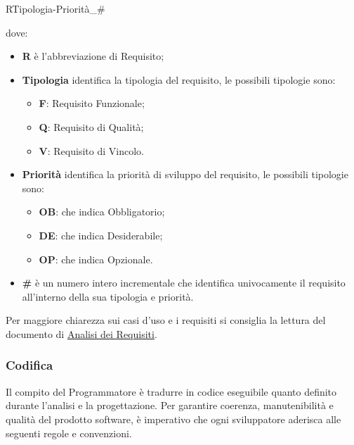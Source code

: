 		\begin{center} RTipologia-Priorità\_\# \end{center}
		dove:
		\begin{itemize}
			\item \textbf{R} è l'abbreviazione di Requisito;
			\item \textbf{Tipologia} identifica la tipologia del requisito, le possibili tipologie sono:
				\begin{itemize}[itemsep=3pt, parsep=1pt, label=$\scriptstyle\bullet$]
					\item \textbf{F}: Requisito Funzionale;
					\item \textbf{Q}: Requisito di Qualità;
					\item \textbf{V}: Requisito di Vincolo.
				\end{itemize}
			\item \textbf{Priorità} identifica la priorità di sviluppo del requisito, le possibili tipologie sono:
				\begin{itemize}[itemsep=3pt, parsep=1pt, label=$\scriptstyle\bullet$]
					\item \textbf{OB}: che indica Obbligatorio;
					\item \textbf{DE}: che indica Desiderabile;
					\item \textbf{OP}: che indica Opzionale.
				\end{itemize}
			\item \textbf{\#} è un numero intero incrementale che identifica univocamente il requisito all’interno della sua tipologia e priorità.
		\end{itemize}
		Per maggiore chiarezza sui casi d’uso e i requisiti si consiglia la lettura del documento di \href{https://nullpointersgroup.github.io/Documentazione/output/RTB/Documenti%20Esterni/Analisi_dei_Requisiti.pdf}{Analisi dei Requisiti}.
	
	\subsubsection{Codifica}
	Il compito del Programmatore è tradurre in codice eseguibile quanto definito durante l’analisi e la progettazione. Per garantire coerenza, manutenibilità e qualità del prodotto software, è imperativo che ogni sviluppatore aderisca alle seguenti regole e convenzioni.

